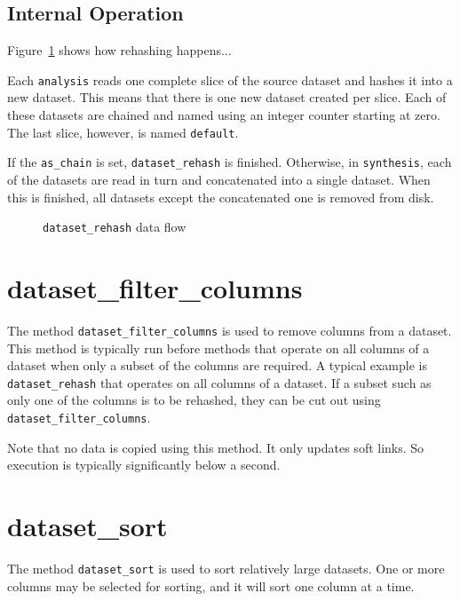 \clearpage
\subsection{Internal Operation}
Figure~\ref{fig:dataset_rehash} shows how rehashing happens...

Each \texttt{analysis} reads one complete slice of the source dataset
and hashes it into a new dataset.  This means that there is one new
dataset created per slice.  Each of these datasets are chained and
named using an integer counter starting at zero.  The last slice,
however, is named \texttt{default}.

If the \texttt{as\_chain} is set, \texttt{dataset\_rehash} is finished.
Otherwise, in \texttt{synthesis}, each of the datasets are read in
turn and concatenated into a single dataset.  When this is finished,
all datasets except the concatenated one is removed from disk.


\begin{figure}[h!]
  \begin{center}
    
  \end{center}
  \caption{\texttt{dataset\_rehash} data flow}
  \label{fig:dataset_rehash}
\end{figure}


\clearpage
\section{dataset\_filter\_columns}
The method \texttt{dataset\_filter\_columns} is used to remove columns
from a dataset.  This method is typically run before methods that
operate on all columns of a dataset when only a subset of the columns
are required.  A typical example is \texttt{dataset\_rehash} that
operates on all columns of a dataset.  If a subset such as only one of
the columns is to be rehashed, they can be cut out using
\texttt{dataset\_filter\_columns}.

Note that no data is copied using this method.  It only updates soft
links.  So execution is typically significantly below a second.





\clearpage
\section{dataset\_sort}
The method \texttt{dataset\_sort} is used to sort relatively large
datasets.  One or more columns may be selected for sorting, and it
will sort one column at a time.

